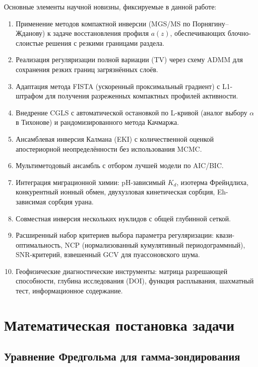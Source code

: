 \documentclass[12pt,a4paper]{article}
\begin{document}
Основные элементы научной новизны, фиксируемые в данной работе:

\begin{enumerate}[leftmargin=*,itemsep=3pt]
  \item Применение методов компактной инверсии (MGS/MS по Порнягину--Жданову)
        к задаче восстановления профиля $a(z)$, обеспечивающих
        блочно-слоистые решения с резкими границами раздела.
  \item Реализация регуляризации полной вариации (TV) через схему
        ADMM для сохранения резких границ загрязнённых слоёв.
  \item Адаптация метода FISTA (ускоренный проксимальный градиент) с L1-штрафом
        для получения разреженных компактных профилей активности.
  \item Внедрение CGLS с автоматической остановкой по L-кривой
        (аналог выбору $\alpha$ в Тихонове) и рандомизированного метода Качмаржа.
  \item Ансамблевая инверсия Калмана (EKI) с количественной оценкой
        апостериорной неопределённости без использования MCMC.
  \item Мультиметодовый ансамбль с отбором лучшей модели по AIC/BIC.
  \item Интеграция миграционной химии: pH-зависимый $K_d$,
        изотерма Фрейндлиха, конкурентный ионный обмен, двухузловая
        кинетическая сорбция, Eh-зависимая сорбция урана.
  \item Совместная инверсия нескольких нуклидов с общей глубинной сеткой.
  \item Расширенный набор критериев выбора параметра регуляризации:
        квази-оптимальность, NCP (нормализованный кумулятивный периодограммный),
        SNR-критерий, взвешенный GCV для пуассоновского шума.
  \item Геофизические диагностические инструменты: матрица разрешающей
        способности, глубина исследования (DOI), функция расплывания,
        шахматный тест, информационное содержание.
\end{enumerate}


\section{Математическая постановка задачи}
\label{sec:problem}

\subsection{Уравнение Фредгольма для гамма-зондирования}
\label{sub:fredholm}
\end{document}
